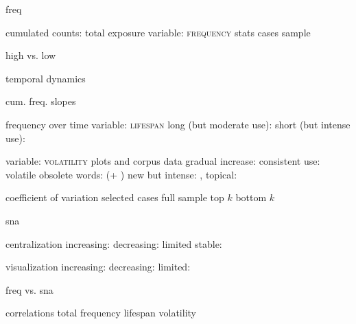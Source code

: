 
freq

  cumulated counts: total exposure
    variable: \textsc{frequency}
    stats
      cases
      sample

    high vs. low

  temporal dynamics

    cum. freq.
      slopes

    frequency over time
      variable: \textsc{lifespan}
        long (but moderate use): 
        short (but intense use): 

      variable: \textsc{volatility}
        plots and corpus data
          gradual increase: 
          consistent use: 
          volatile
            obsolete words:  (+ )
            new but intense: , 
            topical: 

        coefficient of variation
          selected cases
          full sample
            top $k$
            bottom $k$

sna

  centralization
    increasing:
    decreasing:
    limited
    stable: 

  visualization
    increasing: 
    decreasing: 
    limited: 

freq vs. sna

  correlations
    total frequency
    lifespan
    volatility
